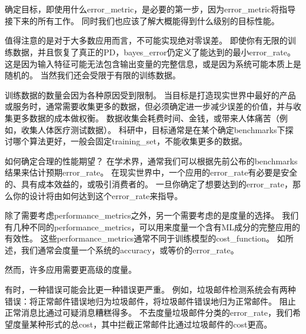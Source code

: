 \section{}
\label{sec:performance_metrics}
确定目标，即使用什么\gls{error_metric}，是必要的第一步，因为\gls{error_metric}将指导接下来的所有工作。
同时我们也应该了解大概能得到什么级别的目标性能。


值得注意的是对于大多数应用而言，不可能实现绝对零误差。
即使你有无限的训练数据，并且恢复了真正的\gls{PD}，\gls{bayes_error}仍定义了能达到的最小\gls{error_rate}。
这是因为输入特征可能无法包含输出变量的完整信息，或是因为系统可能本质上是随机的。
当然我们还会受限于有限的训练数据。

训练数据的数量会因为各种原因受到限制。
当目标是打造现实世界中最好的产品或服务时，通常需要收集更多的数据，但必须确定进一步减少误差的价值，并与收集更多数据的成本做权衡。
数据收集会耗费时间、金钱，或带来人体痛苦（例如，收集人体医疗测试数据）。
科研中，目标通常是在某个确定\gls{benchmarks}下探讨哪个算法更好，一般会固定\gls{training_set}，不能收集更多的数据。


如何确定合理的性能期望？
在学术界，通常我们可以根据先前公布的\gls{benchmarks}结果来估计预期\gls{error_rate}。
在现实世界中，一个应用的\gls{error_rate}有必要是安全的、具有成本效益的，或吸引消费者的。
一旦你确定了想要达到的\gls{error_rate}，那么你的设计将由如何达到这个\gls{error_rate}来指导。


除了需要考虑\gls{performance_metrics}之外，另一个需要考虑的是度量的选择。
我们有几种不同的\gls{performance_metrics}，可以用来度量一个含有\gls{ML}成分的完整应用的有效性。
这些\gls{performance_metrics}通常不同于训练模型的\gls{cost_function}。 
如所述，我们通常会度量一个系统的\gls{accuracy}，或等价的\gls{error_rate}。


然而，许多应用需要更高级的度量。

有时，一种错误可能会比更一种错误更严重。
例如，垃圾邮件检测系统会有两种错误：将正常邮件错误地归为垃圾邮件，将垃圾邮件错误地归为正常邮件。
阻止正常消息比通过可疑消息糟糕得多。
不去度量垃圾邮件分类的\gls{error_rate}，我们希望度量某种形式的总\gls{cost}，其中拦截正常邮件比通过垃圾邮件的\gls{cost}更高。


